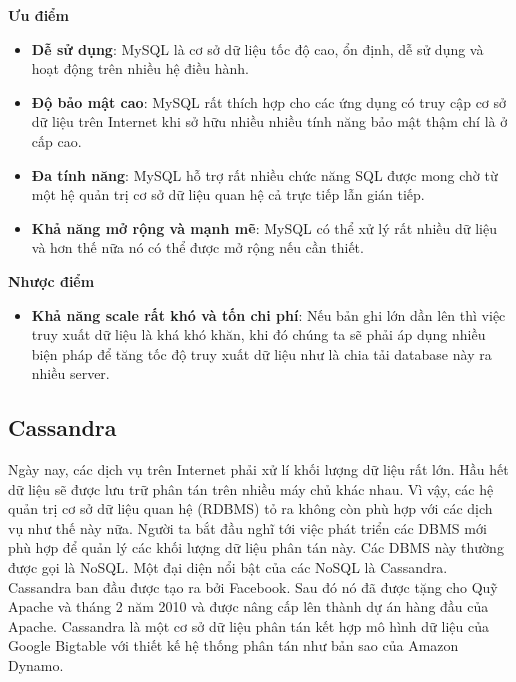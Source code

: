             \textbf{Ưu điểm}
            
            \begin{itemize}
                \item \textbf{Dễ sử dụng}: MySQL là cơ sở dữ liệu tốc độ cao, ổn định, dễ sử dụng và hoạt động trên nhiều hệ điều hành.
                \item \textbf{Độ bảo mật cao}:  MySQL rất thích hợp cho các ứng dụng có truy cập cơ sở dữ liệu trên Internet khi sở hữu nhiều nhiều tính năng bảo mật thậm chí là ở cấp cao.
                \item \textbf{Đa tính năng}: MySQL hỗ trợ rất nhiều chức năng SQL được mong chờ từ một hệ quản trị cơ sở dữ liệu quan hệ cả trực tiếp lẫn gián tiếp.
                \item \textbf{Khả năng mở rộng và mạnh mẽ}: MySQL có thể xử lý rất nhiều dữ liệu và hơn thế nữa nó có thể được mở rộng nếu cần thiết.
            \end{itemize}
            
            \textbf{Nhược điểm}
            
            \begin{itemize}
                \item \textbf{Khả năng scale rất khó và tốn chi phí}: Nếu bản ghi lớn dần lên thì việc truy xuất dữ liệu là khá khó khăn, khi đó chúng ta sẽ phải áp dụng nhiều biện pháp để tăng tốc độ truy xuất dữ liệu như là chia tải database này ra nhiều server.	
            \end{itemize}	
            \subsection{Cassandra}
            
            Ngày nay, các dịch vụ trên Internet phải xử lí khối lượng dữ liệu rất lớn. Hầu hết dữ liệu sẽ được lưu trữ phân tán trên nhiều máy chủ khác nhau. Vì vậy, các hệ quản trị cơ sở dữ liệu quan hệ (RDBMS) tỏ ra không còn phù hợp với các dịch vụ như thế này nữa. Người ta bắt đầu nghĩ tới việc phát triển các DBMS mới phù hợp để quản lý các khối lượng dữ liệu phân tán này. Các DBMS này thường được gọi là NoSQL. Một đại diện nổi bật của các NoSQL là Cassandra.\\
            
            Cassandra ban đầu được tạo ra bởi Facebook. Sau đó nó đã được tặng cho Quỹ Apache và tháng 2 năm 2010 và được nâng cấp lên thành dự án hàng đầu của Apache. Cassandra là một cơ sở dữ liệu phân tán kết hợp mô hình dữ liệu của Google Bigtable với thiết kế hệ thống phân tán như bản sao của Amazon Dynamo.\\
            

